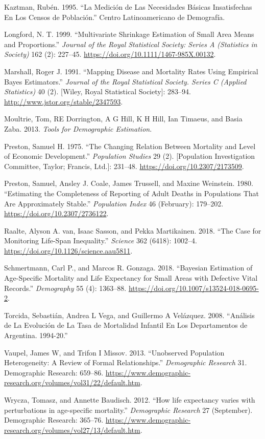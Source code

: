 \documentclass[12pt,]{article}
\begin{document}
\leavevmode\hypertarget{ref-Kaztman1995}{}%
Kaztman, Rubén. 1995. ``La Medición de Las Necesidades Básicas
Insatisfechas En Los Censos de Población.'' Centro Latinoamericano de
Demografía.

\leavevmode\hypertarget{ref-Longford1999}{}%
Longford, N. T. 1999. ``Multivariate Shrinkage Estimation of Small Area
Means and Proportions.'' \emph{Journal of the Royal Statistical Society:
Series A (Statistics in Society)} 162 (2): 227--45.
\url{https://doi.org/10.1111/1467-985X.00132}.

\leavevmode\hypertarget{ref-Marshall1991}{}%
Marshall, Roger J. 1991. ``Mapping Disease and Mortality Rates Using
Empirical Bayes Estimators.'' \emph{Journal of the Royal Statistical
Society. Series C (Applied Statistics)} 40 (2). {[}Wiley, Royal
Statistical Society{]}: 283--94.
\url{http://www.jstor.org/stable/2347593}.

\leavevmode\hypertarget{ref-Moultrie}{}%
Moultrie, Tom, RE Dorrington, A G Hill, K H Hill, Ian Timaeus, and Basia
Zaba. 2013. \emph{Tools for Demographic Estimation}.

\leavevmode\hypertarget{ref-Preston_1975}{}%
Preston, Samuel H. 1975. ``The Changing Relation Between Mortality and
Level of Economic Development.'' \emph{Population Studies} 29 (2).
{[}Population Investigation Committee, Taylor; Francis, Ltd.{]}:
231--48. \url{https://doi.org/10.2307/2173509}.

\leavevmode\hypertarget{ref-Preston1980}{}%
Preston, Samuel, Ansley J. Coale, James Trussell, and Maxine Weinstein.
1980. ``Estimating the Completeness of Reporting of Adult Deaths in
Populations That Are Approximately Stable.'' \emph{Population Index} 46
(February): 179--202. \url{https://doi.org/10.2307/2736122}.

\leavevmode\hypertarget{ref-vanRaalte_Sasson_Martikainen_2018}{}%
Raalte, Alyson A. van, Isaac Sasson, and Pekka Martikainen. 2018. ``The
Case for Monitoring Life-Span Inequality.'' \emph{Science} 362 (6418):
1002--4. \url{https://doi.org/10.1126/science.aau5811}.

\leavevmode\hypertarget{ref-Schmertmann2018}{}%
Schmertmann, Carl P., and Marcos R. Gonzaga. 2018. ``Bayesian Estimation
of Age-Specific Mortality and Life Expectancy for Small Areas with
Defective Vital Records.'' \emph{Demography} 55 (4): 1363--88.
\url{https://doi.org/10.1007/s13524-018-0695-2}.

\leavevmode\hypertarget{ref-torcida2008}{}%
Torcida, Sebastián, Andrea L Vega, and Guillermo A Velázquez. 2008.
``Análisis de La Evolución de La Tasa de Mortalidad Infantil En Los
Departamentos de Argentina. 1994-20.''

\leavevmode\hypertarget{ref-Vaupel_Missov_2013}{}%
Vaupel, James W, and Trifon I Missov. 2013. ``Unobserved Population
Heterogeneity: A Review of Formal Relationships.'' \emph{Demographic
Research} 31. Demographic Research: 659--86.
\url{https://www.demographic-research.org/volumes/vol31/22/default.htm}.

\leavevmode\hypertarget{ref-Wrycza2012}{}%
Wrycza, Tomasz, and Annette Baudisch. 2012. ``How life expectancy varies
with perturbations in age-specific mortality.'' \emph{Demographic
Research} 27 (September). Demographic Research: 365--76.
\url{https://www.demographic-research.org/volumes/vol27/13/default.htm}.
\end{document}

